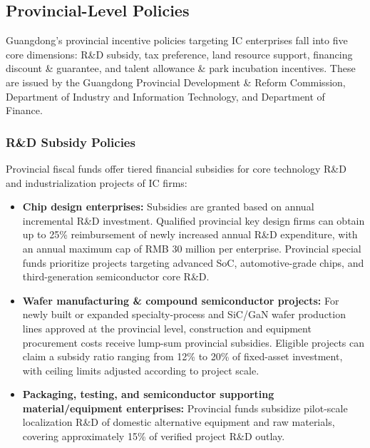 \documentclass[12pt,a4paper]{article}
\begin{document}
\subsection{Provincial-Level Policies}
\label{sec:provincial_policy}

Guangdong's provincial incentive policies targeting IC enterprises fall
into five core dimensions: R\&D subsidy, tax preference, land resource
support, financing discount \& guarantee, and talent allowance \& park
incubation incentives. These are issued by the Guangdong Provincial
Development \& Reform Commission, Department of Industry and Information
Technology, and Department of Finance.

\subsubsection{R\&D Subsidy Policies}

Provincial fiscal funds offer tiered financial subsidies for core
technology R\&D and industrialization projects of IC firms:

\begin{itemize}
    \item \textbf{Chip design enterprises:} Subsidies are granted based
          on annual incremental R\&D investment. Qualified provincial key
          design firms can obtain up to 25\% reimbursement of newly
          increased annual R\&D expenditure, with an annual maximum cap
          of RMB 30 million per enterprise. Provincial special funds
          prioritize projects targeting advanced SoC, automotive-grade
          chips, and third-generation semiconductor core R\&D.
    \item \textbf{Wafer manufacturing \& compound semiconductor projects:}
          For newly built or expanded specialty-process and SiC/GaN wafer
          production lines approved at the provincial level, construction
          and equipment procurement costs receive lump-sum provincial
          subsidies. Eligible projects can claim a subsidy ratio ranging
          from 12\% to 20\% of fixed-asset investment, with ceiling limits
          adjusted according to project scale.
    \item \textbf{Packaging, testing, and semiconductor supporting
          material/equipment enterprises:} Provincial funds subsidize
          pilot-scale localization R\&D of domestic alternative equipment
          and raw materials, covering approximately 15\% of verified
          project R\&D outlay.
\end{itemize}
\end{document}
